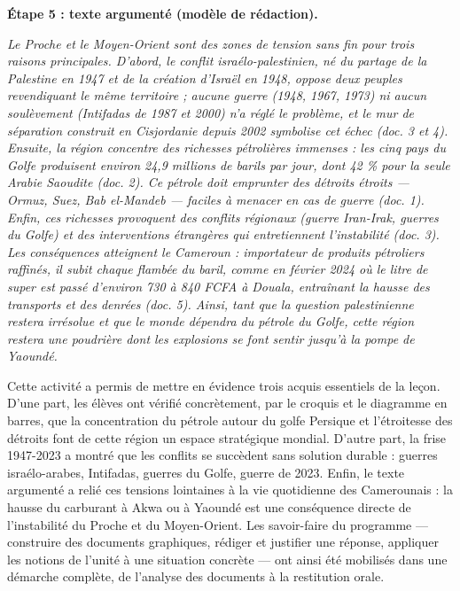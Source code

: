 \documentclass[11pt]{article}
\newcommand{\cle}[1]{{\popxbold\color{popdark}#1}}
\newcounter{popsec}
\newcounter{popsub}
\newcommand{\courssub}[1]{%
  \stepcounter{popsub}%
  \par\vspace{9pt}\noindent{\popxbold\fontsize{11.5}{13}\selectfont\color{popink}{\color{poporange}\thepopsec.\thepopsub}\hspace{6pt}#1}\par\nopagebreak\vspace{4pt}
}
\begin{document}
\begin{exoresolu}
\textbf{Étape 5 : texte argumenté (modèle de rédaction).}

\emph{Le Proche et le Moyen-Orient sont des zones de tension sans fin pour trois raisons principales. D'abord, le conflit israélo-palestinien, né du partage de la Palestine en 1947 et de la création d'Israël en 1948, oppose deux peuples revendiquant le même territoire ; aucune guerre (1948, 1967, 1973) ni aucun soulèvement (Intifadas de 1987 et 2000) n'a réglé le problème, et le mur de séparation construit en Cisjordanie depuis 2002 symbolise cet échec (doc. 3 et 4). Ensuite, la région concentre des richesses pétrolières immenses : les cinq pays du Golfe produisent environ 24,9 millions de barils par jour, dont 42 \% pour la seule Arabie Saoudite (doc. 2). Ce pétrole doit emprunter des détroits étroits — Ormuz, Suez, Bab el-Mandeb — faciles à menacer en cas de guerre (doc. 1). Enfin, ces richesses provoquent des conflits régionaux (guerre Iran-Irak, guerres du Golfe) et des interventions étrangères qui entretiennent l'instabilité (doc. 3). Les conséquences atteignent le Cameroun : importateur de produits pétroliers raffinés, il subit chaque flambée du baril, comme en février 2024 où le litre de super est passé d'environ 730 à 840 FCFA à Douala, entraînant la hausse des transports et des denrées (doc. 5). Ainsi, tant que la question palestinienne restera irrésolue et que le monde dépendra du pétrole du Golfe, cette région restera une poudrière dont les explosions se font sentir jusqu'à la pompe de Yaoundé.}
\end{exoresolu}

\courssub{Bilan de l'activité}

Cette activité a permis de mettre en évidence trois acquis essentiels de la leçon. D'une part, les élèves ont vérifié concrètement, par le croquis et le diagramme en barres, que la concentration du pétrole autour du golfe Persique et l'étroitesse des détroits font de cette région un espace \cle{stratégique} mondial. D'autre part, la frise 1947-2023 a montré que les conflits se succèdent sans solution durable : guerres israélo-arabes, Intifadas, guerres du Golfe, guerre de 2023. Enfin, le texte argumenté a relié ces tensions lointaines à la vie quotidienne des Camerounais : la hausse du carburant à Akwa ou à Yaoundé est une conséquence directe de l'instabilité du Proche et du Moyen-Orient. Les savoir-faire du programme — construire des documents graphiques, rédiger et justifier une réponse, appliquer les notions de l'unité à une situation concrète — ont ainsi été mobilisés dans une démarche complète, de l'analyse des documents à la restitution orale.
\end{document}
